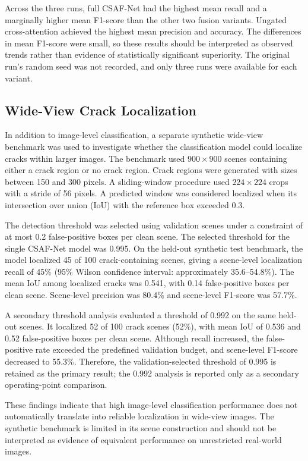 \documentclass[12pt,a4paper,oneside]{article}
\begin{document}
Across the three runs, full CSAF-Net had the highest mean
recall and a marginally higher mean F1-score than the other
two fusion variants. Ungated cross-attention achieved the
highest mean precision and accuracy. The differences in mean
F1-score were small, so these results should be interpreted
as observed trends rather than evidence of statistically
significant superiority. The original run's random seed was
not recorded, and only three runs were available for each
variant.

\subsection{Wide-View Crack Localization}

In addition to image-level classification, a separate synthetic
wide-view benchmark was used to investigate whether the
classification model could localize cracks within larger images.
The benchmark used $900 \times 900$ scenes containing either a
crack region or no crack region. Crack regions were generated
with sizes between 150 and 300 pixels. A sliding-window
procedure used $224 \times 224$ crops with a stride of 56 pixels.
A predicted window was considered localized when its intersection
over union (IoU) with the reference box exceeded 0.3.

The detection threshold was selected using validation scenes
under a constraint of at most 0.2 false-positive boxes per
clean scene. The selected threshold for the single CSAF-Net
model was 0.995. On the held-out synthetic test benchmark,
the model localized 45 of 100 crack-containing scenes, giving
a scene-level localization recall of 45\% (95\% Wilson
confidence interval: approximately 35.6--54.8\%). The mean
IoU among localized cracks was 0.541, with 0.14 false-positive
boxes per clean scene. Scene-level precision was 80.4\% and
scene-level F1-score was 57.7\%.

A secondary threshold analysis evaluated a threshold of 0.992
on the same held-out scenes. It localized 52 of 100 crack
scenes (52\%), with mean IoU of 0.536 and 0.52 false-positive
boxes per clean scene. Although recall increased, the false-
positive rate exceeded the predefined validation budget, and
scene-level F1-score decreased to 55.3\%. Therefore, the
validation-selected threshold of 0.995 is retained as the
primary result; the 0.992 analysis is reported only as a
secondary operating-point comparison.

These findings indicate that high image-level classification
performance does not automatically translate into reliable
localization in wide-view images. The synthetic benchmark is
limited in its scene construction and should not be interpreted
as evidence of equivalent performance on unrestricted real-world
images.
\end{document}
